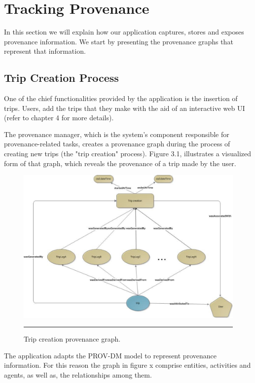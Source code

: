 \section{Tracking Provenance}

In this section we will explain how our application captures, stores and exposes provenance information. We start by presenting the provenance graphs that represent that information. 

\subsection{Trip Creation Process}

One of the chief functionalities provided by the application is the insertion of trips. Users, add the trips that they make with the aid of an interactive web UI (refer to chapter 4 for more details).

The provenance manager, which is the system's component responsible for provenance-related tasks, creates a provenance graph during the process of creating new trips (the "trip creation" process). Figure 3.1, illustrates a visualized form of that graph, which reveals the provenance of a trip made by the user.

\begin{figure}[htbp]
	\centering
		\includegraphics[scale=0.40]{./Figures/chapter3/figure1.pdf}
		\rule{35em}{0.5pt}
	\caption[Trip creation provenance graph]{Trip creation provenance graph.}
	\label{fig:provTripCreationGraph}
\end{figure}

The application adapts the PROV-DM model to represent provenance information. For this reason the graph in figure x comprise entities, activities and agents, as well as, the relationships among them.

